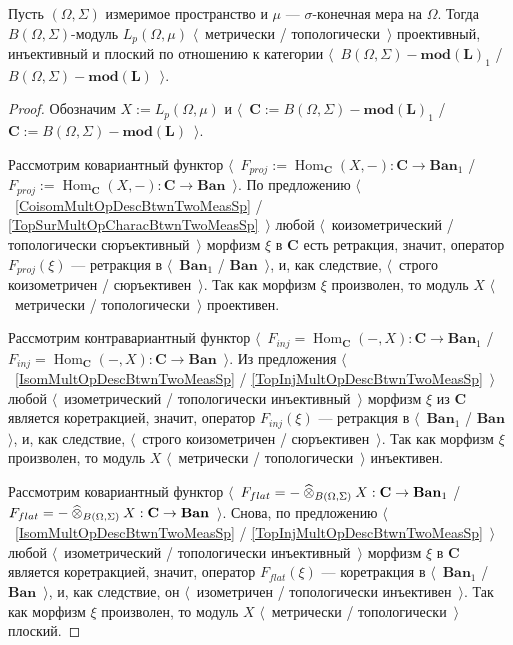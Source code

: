 \begin{proposition}\label{HomTrivlOfLpCat} Пусть $(\Omega,\Sigma)$ измеримое пространство и $\mu$ --- $\sigma$-конечная мера на $\Omega$. Тогда $B(\Omega,\Sigma)$-модуль $L_p(\Omega,\mu)$ $\langle$~метрически / топологически~$\rangle$ проективный, инъективный и плоский по отношению к категории $\langle$~$B(\Omega,\Sigma)-\mathbf{mod(L)}_1$ / $B(\Omega,\Sigma)-\mathbf{mod(L)}$~$\rangle$.
\end{proposition}
\begin{proof} Обозначим $X:=L_p(\Omega,\mu)$ и $\langle$~$\mathbf{C}:=B(\Omega,\Sigma)-\mathbf{mod(L)}_1$ / $\mathbf{C}:=B(\Omega,\Sigma)-\mathbf{mod(L)}$~$\rangle$. 

Рассмотрим ковариантный функтор $\langle$~$F_{proj}:=\operatorname{Hom}_{\mathbf{C}}(X,-):\mathbf{C}\to\mathbf{Ban}_1$ / $F_{proj}:=\operatorname{Hom}_{\mathbf{C}}(X,-):\mathbf{C}\to\mathbf{Ban}$~$\rangle$. По предложению $\langle$~\ref{CoisomMultOpDescBtwnTwoMeasSp} / \ref{TopSurMultOpCharacBtwnTwoMeasSp}~$\rangle$ любой $\langle$~коизометрический / топологически сюръективный~$\rangle$ морфизм $\xi$ в $\mathbf{C}$ есть ретракция, значит, оператор $F_{proj}(\xi)$ --- ретракция в $\langle$~$\mathbf{Ban}_1$ / $\mathbf{Ban}$~$\rangle$, и, как следствие, $\langle$~строго коизометричен / сюръективен~$\rangle$. Так как морфизм $\xi$ произволен, то модуль $X$ $\langle$~метрически / топологически~$\rangle$ проективен.

Рассмотрим контравариантный функтор $\langle$~$F_{inj}=\operatorname{Hom}_{\mathbf{C}}(-,X):\mathbf{C}\to\mathbf{Ban}_1$ / $F_{inj}=\operatorname{Hom}_{\mathbf{C}}(-,X):\mathbf{C}\to\mathbf{Ban}$~$\rangle$. Из предложения $\langle$~\ref{IsomMultOpDescBtwnTwoMeasSp} / \ref{TopInjMultOpDescBtwnTwoMeasSp}~$\rangle$ любой $\langle$~изометрический / топологически инъективный~$\rangle$ морфизм $\xi$ из $\mathbf{C}$ является коретракцией, значит, оператор $F_{inj}(\xi)$ --- ретракция в $\langle$~$\mathbf{Ban}_1$ / $\mathbf{Ban}$~$\rangle$, и, как следствие, $\langle$~строго коизометричен / сюръективен~$\rangle$. Так как морфизм $\xi$ произволен, то модуль $X$ $\langle$~метрически / топологически~$\rangle$ инъективен.

Рассмотрим ковариантный функтор $\langle$~$F_{flat}=-\mathbin{\widehat{\otimes}}_{B(\Omega,\Sigma)}X:\mathbf{C}\to\mathbf{Ban}_1$ / $F_{flat}=-\mathbin{\widehat{\otimes}}_{B(\Omega,\Sigma)}X:\mathbf{C}\to\mathbf{Ban}$~$\rangle$. Снова, по предложению $\langle$~\ref{IsomMultOpDescBtwnTwoMeasSp} / \ref{TopInjMultOpDescBtwnTwoMeasSp}~$\rangle$ любой $\langle$~изометрический / топологически инъективный~$\rangle$ морфизм $\xi$ в $\mathbf{C}$ является коретракцией, значит, оператор $F_{flat}(\xi)$ --- коретракция в $\langle$~$\mathbf{Ban}_1$ / $\mathbf{Ban}$~$\rangle$, и, как следствие, он $\langle$~изометричен / топологически инъективен~$\rangle$. Так как морфизм $\xi$ произволен, то модуль $X$ $\langle$~метрически / топологически~$\rangle$ плоский.
\end{proof}